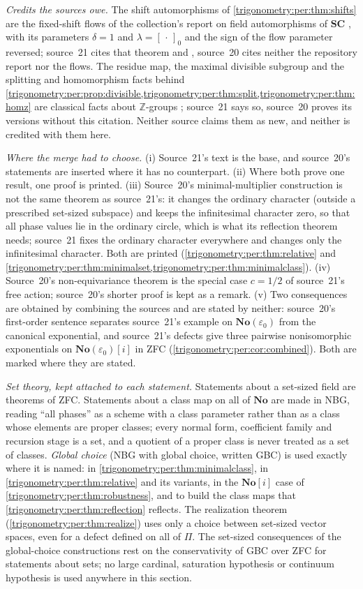 \documentclass[11pt,letterpaper]{article}
\numberwithin{equation}{section}
\theoremstyle{definition}
\theoremstyle{remark}
\newcommand{\No}{\mathbf{No}}
\newcommand{\SC}{\mathbf{SC}}
\newcommand{\Z}{\mathbb Z}
\newcommand{\eps}{\varepsilon}
\begin{document}
\emph{Credits the sources owe.} The shift automorphisms of \cref{trigonometry:per:thm:shifts} are the
fixed-shift flows of the collection's report on field automorphisms of $\SC$ \cite[Theorem 5.2,
label \texttt{saut:thm:shiftflow}]{Saut}, with its parameters $\delta=1$ and $\lambda=[\,\cdot\,]_0$
and the sign of the flow parameter reversed; source~21 cites that theorem and \cite[\S4]{KKS},
source~20 cites neither the repository report nor the flows. The residue map, the maximal divisible
subgroup and the splitting and homomorphism facts behind
\cref{trigonometry:per:prop:divisible,trigonometry:per:thm:split,trigonometry:per:thm:homz} are
classical facts about $\Z$-groups \cite[\S\S2--4]{Jerabek}; source~21 says so, source~20 proves its
versions without this citation. Neither source claims them as new, and neither is credited with them
here.

\emph{Where the merge had to choose.} (i) Source~21's text is the base, and source~20's statements are
inserted where it has no counterpart. (ii) Where both prove one result, one proof is printed.
(iii) Source~20's minimal-multiplier construction is not the same theorem as source~21's: it changes
the ordinary character (outside a prescribed set-sized subspace) and keeps the infinitesimal
character zero, so that all phase values lie in the ordinary circle, which is what its reflection
theorem needs; source~21 fixes the ordinary character everywhere and changes only the infinitesimal
character. Both are printed (\cref{trigonometry:per:thm:relative} and
\cref{trigonometry:per:thm:minimalset,trigonometry:per:thm:minimalclass}). (iv) Source~20's
non-equivariance theorem is the special case $c=1/2$ of source~21's free action; source~20's shorter
proof is kept as a remark. (v) Two consequences are obtained by combining the sources and are stated by
neither: source~20's first-order sentence separates source~21's example on $\No(\eps_0)$ from the
canonical exponential, and source~21's defects give three pairwise nonisomorphic exponentials on
$\No(\eps_0)[i]$ in ZFC (\cref{trigonometry:per:cor:combined}). Both are marked where they are stated.

\emph{Set theory, kept attached to each statement.} Statements about a set-sized field are theorems
of ZFC. Statements about a class map on all of $\No$ are made in NBG, reading ``all phases'' as a
scheme with a class parameter rather than as a class whose elements are proper classes; every
normal form, coefficient family and recursion stage is a set, and a quotient of a proper class is
never treated as a set of classes. \emph{Global choice} (NBG with global choice, written GBC) is
used exactly where it is named: in \cref{trigonometry:per:thm:minimalclass}, in
\cref{trigonometry:per:thm:relative} and its variants, in the $\No[i]$ case of
\cref{trigonometry:per:thm:robustness}, and to build the class maps that
\cref{trigonometry:per:thm:reflection} reflects. The realization theorem
(\cref{trigonometry:per:thm:realize}) uses only a choice between set-sized vector spaces, even for a
defect defined on all of $\Pi$. The set-sized consequences of the global-choice constructions rest on
the conservativity of GBC over ZFC for statements about sets; no large cardinal, saturation hypothesis
or continuum hypothesis is used anywhere in this section.
\end{document}
